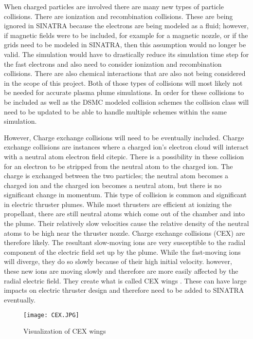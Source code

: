 \indent When charged particles are involved there are many new types of particle collisions. There are ionization and recombination collisions. These are being ignored in SINATRA because the electrons are being modeled as a fluid; however, if magnetic fields were to be included, for example for a magnetic nozzle, or if the grids need to be modeled in SINATRA, then this assumption would no longer be valid. The simulation would have to drastically reduce its simulation time step for the fast electrons and also need to consider ionization and recombination collisions. There are also chemical interactions that are also not being considered in the scope of this project. Both of those types of collisions will most likely not be needed for accurate plasma plume simulations. In order for these collisions to be included as well as the DSMC modeled collision schemes the collision class will need to be updated to be able to handle multiple schemes within the same simulation. \par

\indent However, Charge exchange collisions will need to be eventually included. Charge exchange collisions are instances where a charged ion’s electron cloud will interact with a neutral atom electron field cite{pic}. There is a possibility in these collision for an electron to be stripped from the neutral atom to the charged ion. The charge is exchanged between the two particles; the neutral atom becomes a charged ion and the charged ion becomes a neutral atom, but there is no significant change in momentum. This type of collision is common and significant in electric thruster plumes. While most thrusters are efficient at ionizing the propellant, there are still neutral atoms which come out of the chamber and into the plume. Their relatively slow velocities cause the relative density of the neutral atoms to be high near the thruster nozzle. Charge exchange collisions (CEX) are therefore likely. The resultant slow-moving ions are very susceptible to the radial component of the electric field set up by the plume. While the fast-moving ions will diverge, they do so slowly because of their high initial velocity. however, these new ions are moving slowly and therefore are more easily affected by the radial electric field. They create what is called CEX wings \cite{cex_wings}. These can have large impacts on electric thruster design and therefore need to be added to SINATRA eventually.


\begin{figure}
\texttt{[image: CEX.JPG]}
\centering
\caption{Visualization of CEX wings\cite{cex_wings}}
\label{fig:CEX}
\end{figure}

